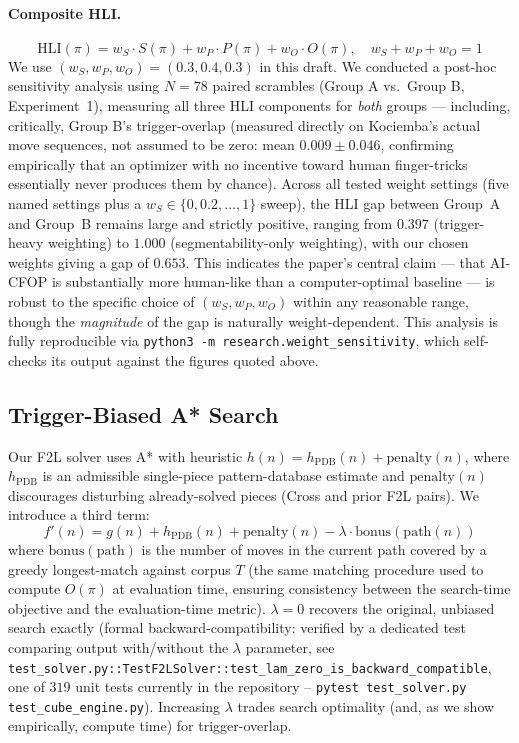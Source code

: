 \documentclass[10pt,conference]{article}
\begin{document}
\paragraph{Composite HLI.}
$$\mathrm{HLI}(\pi) = w_S \cdot S(\pi) + w_P \cdot P(\pi) + w_O \cdot O(\pi), \quad w_S{+}w_P{+}w_O = 1$$
We use $(w_S, w_P, w_O) = (0.3, 0.4, 0.3)$ in this draft. We
conducted a post-hoc sensitivity analysis using $N=78$ paired
scrambles (Group A vs.\ Group B, Experiment~1), measuring all three
HLI components for \emph{both} groups --- including, critically,
Group B's trigger-overlap (measured directly on Kociemba's actual
move sequences, not assumed to be zero: mean $0.009 \pm 0.046$,
confirming empirically that an optimizer with no incentive toward
human finger-tricks essentially never produces them by chance).
Across all tested weight settings (five named settings plus a
$w_S \in \{0,0.2,\ldots,1\}$ sweep), the HLI gap between Group~A and
Group~B remains large and strictly positive, ranging from $0.397$
(trigger-heavy weighting) to $1.000$ (segmentability-only
weighting), with our chosen weights giving a gap of $0.653$. This
indicates the paper's central claim --- that AI-CFOP is
substantially more human-like than a computer-optimal baseline ---
is robust to the specific choice of $(w_S,w_P,w_O)$ within any
reasonable range, though the \emph{magnitude} of the gap is
naturally weight-dependent. This analysis is fully reproducible via
\texttt{python3 -m research.weight\_sensitivity}, which self-checks
its output against the figures quoted above.

\subsection{Trigger-Biased A* Search}

Our F2L solver uses A* with heuristic
$h(n) = h_{\mathrm{PDB}}(n) + \mathrm{penalty}(n)$, where
$h_{\mathrm{PDB}}$ is an admissible single-piece pattern-database
estimate and $\mathrm{penalty}(n)$ discourages disturbing
already-solved pieces (Cross and prior F2L pairs). We introduce a
third term:
$$f'(n) = g(n) + h_{\mathrm{PDB}}(n) + \mathrm{penalty}(n) - \lambda \cdot \mathrm{bonus}(\mathrm{path}(n))$$
where $\mathrm{bonus}(\mathrm{path})$ is the number of moves in the
current path covered by a greedy longest-match against corpus $T$
(the same matching procedure used to compute $O(\pi)$ at evaluation
time, ensuring consistency between the search-time objective and the
evaluation-time metric). $\lambda=0$ recovers the original,
unbiased search exactly (formal backward-compatibility: verified by a
dedicated test comparing output with/without the $\lambda$ parameter,
see
\texttt{test\_solver.py::TestF2LSolver::test\_lam\_zero\_is\_backward\_compatible},
one of $319$ unit tests currently in the repository --
\texttt{pytest test\_solver.py test\_cube\_engine.py}).
Increasing $\lambda$ trades search optimality (and, as we show
empirically, compute time) for trigger-overlap.
\end{document}
